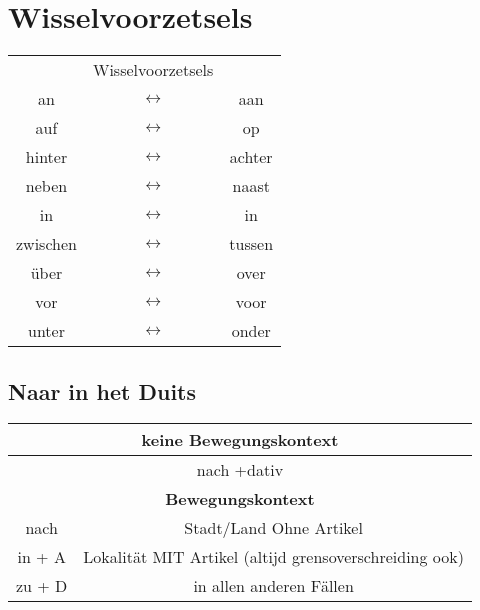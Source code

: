 \documentclass[main.tex]{subfiles}
\begin{document}
\section{Wisselvoorzetsels}

\begin{tabular}{ccc}
 & Wisselvoorzetsels &  \\ 
an & $\leftrightarrow$ & aan \\ 
auf & $\leftrightarrow$ & op \\ 
hinter & $\leftrightarrow$ & achter \\ 
neben & $\leftrightarrow$ & naast \\ 
in & $\leftrightarrow$ & in \\ 
zwischen & $\leftrightarrow$ & tussen \\ 
über & $\leftrightarrow$ & over \\ 
vor & $\leftrightarrow$ & voor \\ 
unter & $\leftrightarrow$ & onder \\ 
\end{tabular} 

\subsection{Naar in het Duits}
\begin{tabular}{| c | c | c | c |}
\hline
\multicolumn{4}{|c|}{\textbf{keine Bewegungskontext}}\\
\hline
\multicolumn{4}{|c|}{nach +dativ}\\
\hline
\hline
\multicolumn{4}{|c|}{\textbf{Bewegungskontext}}\\
\hline
nach & \multicolumn{3}{|c|}{Stadt/Land Ohne Artikel}\\
\hline
in + A & \multicolumn{3}{|c|}{Lokalität MIT Artikel (altijd grensoverschreiding ook)}\\
\hline
zu + D & \multicolumn{3}{|c|}{in allen anderen Fällen}\\
\hline
\end{tabular}
\end{document}
